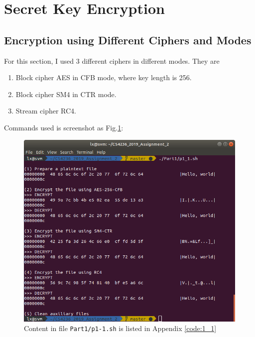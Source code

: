 \section{Secret Key Encryption}

\subsection{Encryption using Different Ciphers and Modes}

For this section, I used 3 different ciphers in different modes. 
They are
\begin{enumerate}
    \item Block cipher AES in CFB mode, where key length is 256.
    \item Block cipher SM4 in CTR mode.
    \item Stream cipher RC4.
\end{enumerate}%

Commands used is screenshot as Fig.\ref{fig:p1_1}:

\begin{figure}[hb]
\centering
\includegraphics[width=\columnwidth]{pictures/p1-1.png}
\caption{
    Content in file \texttt{Part1/p1-1.sh} is listed in Appendix \ref{code:1_1}
}
\label{fig:p1_1}
\end{figure}

